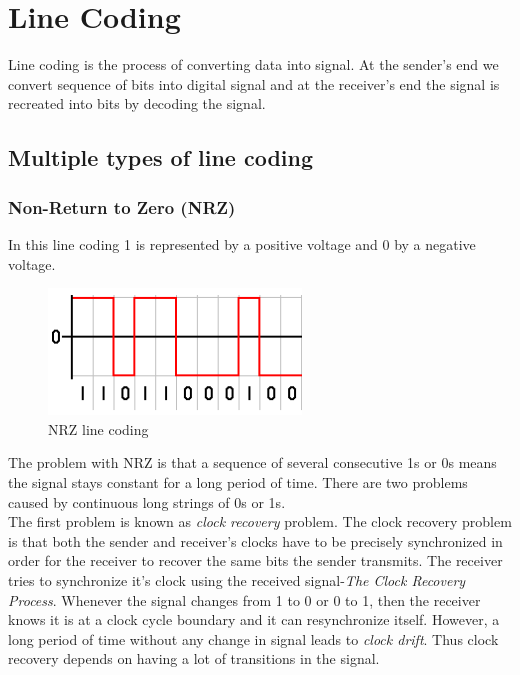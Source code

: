 \section{Line Coding}
\label{line_coding}
Line coding is the process of converting data into signal. At the sender's end we convert sequence of bits into digital signal and at the receiver's end the signal is recreated into bits by decoding the signal.

\subsection{Multiple types of line coding}
\subsubsection{Non-Return to Zero (NRZ)}
\label{NRZ}
In this line coding 1 is represented by a positive voltage and 0 by a negative voltage.

\begin{figure}[H]
    \centering
    \includegraphics[width=0.6\textwidth]{img/NRZ.png}
    \caption{NRZ line coding}
    \label{fig:NRZ}
\end{figure}

The problem with NRZ is that a sequence of several consecutive 1s or 0s means the signal stays constant for a long period of time. There are two problems caused by continuous long strings of 0s or 1s.\\

The first problem is known as \textit{clock recovery} problem. The clock recovery problem is that both the sender and receiver's clocks have to be precisely synchronized in order for the receiver to recover the same bits the sender transmits. The receiver tries to synchronize it's clock using the received signal-\textit{The Clock Recovery Process}. Whenever the signal changes from 1 to 0 or 0 to 1, then the receiver knows it is at a clock cycle boundary and it can resynchronize itself. However, a long period of time without any change in signal leads to \textit{clock drift}. Thus clock recovery depends on having a lot of transitions in the signal.\\

